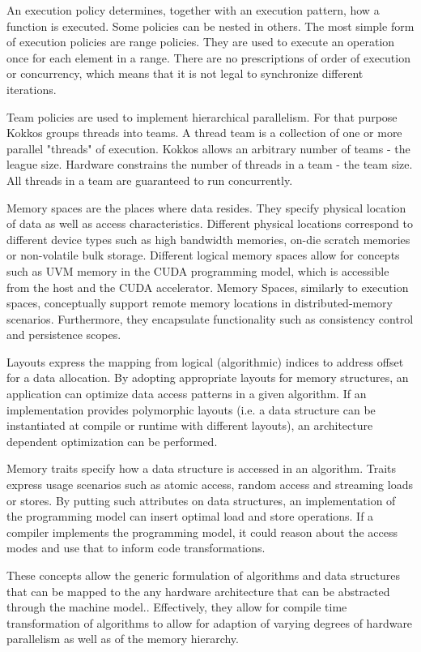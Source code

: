 An execution policy determines, together with an execution pattern, how a function is executed. Some policies can be nested in others. The most simple form of execution policies are range policies. They are used to execute an operation once for each element in a range. There are no prescriptions of order of execution or concurrency, which means that it is not legal to synchronize different iterations.

Team policies are used to implement hierarchical parallelism. For that purpose Kokkos groups threads into teams. A thread team is a collection of one or more parallel "threads" of execution. Kokkos allows an arbitrary number of teams - the league size. Hardware constrains the number of threads in a team - the team size. All threads in a team are guaranteed to run concurrently.

Memory spaces are the places where data resides. They specify physical location of data as well as access characteristics. Different physical locations correspond to different device types such as high bandwidth memories, on-die scratch memories or non-volatile bulk storage. Different logical memory spaces allow for concepts such as UVM memory in the CUDA programming model, which is accessible from the host and the CUDA accelerator. Memory Spaces, similarly to execution spaces, conceptually support remote memory locations in distributed-memory scenarios. Furthermore, they encapsulate functionality such as consistency control and persistence scopes.

Layouts express the mapping from logical (algorithmic) indices to address offset for a data allocation. By adopting appropriate layouts for memory structures, an application can optimize data access patterns in a given algorithm. If an implementation provides polymorphic layouts (i.e. a data structure can be instantiated at compile or runtime with different layouts), an architecture dependent optimization can be performed.

Memory traits specify how a data structure is accessed in an algorithm. Traits express usage scenarios such as atomic access, random access and streaming loads or stores. By putting such attributes on data structures, an implementation of the programming model can insert optimal load and store operations. If a compiler implements the programming model, it could reason about the access modes and use that to inform code transformations.

These concepts allow the generic formulation of algorithms and data structures that can be mapped to the any hardware architecture that can be abstracted through the machine model.. Effectively, they allow for compile time transformation of algorithms to allow for adaption of varying degrees of hardware parallelism as well as of the memory hierarchy.


